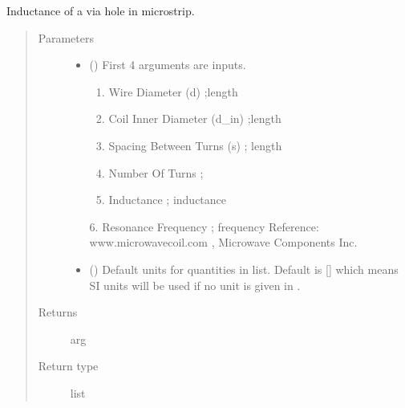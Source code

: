 \documentclass[letterpaper,10pt,english]{sphinxmanual}
\begin{document}

\begin{fulllineitems}
\label{\detokenize{components:components.L_air_core_coil}}
Inductance of a via hole in microstrip.
\begin{quote}\begin{description}
\item[{Parameters}] \leavevmode\begin{itemize}
\item {} 
 () \textendash{} 
First 4 arguments are inputs.
\begin{enumerate}
%
\item {} 
Wire Diameter (d) ;length

\item {} 
Coil Inner Diameter (d\_in) ;length

\item {} 
Spacing Between Turns (s) ; length

\item {} 
Number Of Turns ;

\item {} 
Inductance ; inductance

\end{enumerate}

6. Resonance Frequency ; frequency
Reference:  www.microwavecoil.com , Microwave Components Inc.


\item {} 
 (\sphinxstyleliteralemphasis{\sphinxupquote{, }}) \textendash{} Default units for quantities in  list. Default is {[}{]} which means SI units will be used if no unit is given in .

\end{itemize}

\item[{Returns}] \leavevmode
arg

\item[{Return type}] \leavevmode
list

\end{description}\end{quote}

\end{fulllineitems}
\end{document}
